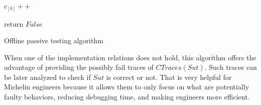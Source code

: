 \begin{algorithm}[h]
{{{                    

                    $c_{[b]}++$\;
                }
        }
        return $False$\;
    }

    \caption{Offline passive testing algorithm}
    \label{algo:check}
\end{algorithm}

When one of the implementation relations does not hold, this
algorithm offers the advantage of providing the possibly fail
traces of $CTraces({Sut})$. Such traces can be later analyzed to
check if $\mathit{Sut}$ is correct or not. That is very helpful
for Michelin engineers because it allows them to only focus on
what are potentially faulty behaviors, reducing debugging time,
and making engineers more efficient.

